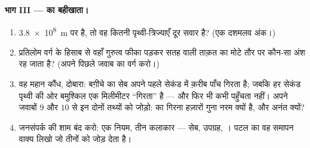 \begin{problem}
\medskip\noindent\textbf{भाग III ---  का बहीखाता।}
\begin{enumerate}[resume]
  \item {} \qty{3.8e8}{m} पर है, तो वह कितनी पृथ्वी-त्रिज्याएँ
        दूर सवार है? (एक दशमलव अंक।)
  \item प्रतिलोम वर्ग के हिसाब से वहाँ गुरुत्व फीका पड़कर सतह वाली
        ताक़त का मोटे तौर पर कौन-सा अंश रह जाता है? (अपने पिछले जवाब
        का वर्ग करो।)
  \item वह महान कौंध, दोबारा: बग़ीचे का सेब अपने पहले सेकंड में
        क़रीब पाँच  गिरता है; जबकि  हर सेकंड पृथ्वी की ओर
        बमुश्किल एक मिलीमीटर ``गिरता'' है --- और फिर भी कभी पहुँचता
        नहीं। अपने जवाबों $9$ और $10$ से इन दोनों तथ्यों को जोड़ो:
         का गिरना हज़ारों गुना नरम क्यों है, और अनंत क्यों?
  \item जनसंपर्क की शाम बंद करो: एक नियम, तीन कलाकार --- सेब, उपग्रह,
        । पटल का वह समापन वाक्य लिखो जो तीनों को जोड़ देता है।
\end{enumerate}
\end{problem}
